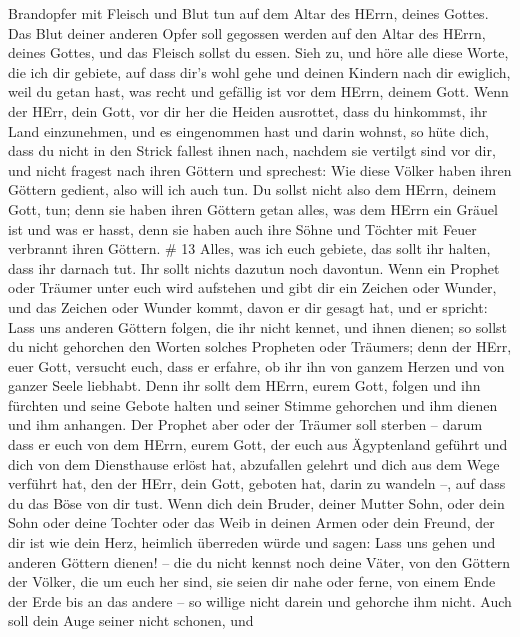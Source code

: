 Brandopfer mit Fleisch und Blut tun auf dem Altar des HErrn, deines
Gottes. Das Blut deiner anderen Opfer soll gegossen werden auf den Altar
des HErrn, deines Gottes, und das Fleisch sollst du essen. 
Sieh zu, und höre alle diese Worte, die ich dir gebiete, auf dass dir's
wohl gehe und deinen Kindern nach dir ewiglich, weil du getan hast, was
recht und gefällig ist vor dem HErrn, deinem Gott.  Wenn
der HErr, dein Gott, vor dir her die Heiden ausrottet, dass du
hinkommst, ihr Land einzunehmen, und es eingenommen hast und darin
wohnst,  so hüte dich, dass du nicht in den Strick fallest
ihnen nach, nachdem sie vertilgt sind vor dir, und nicht fragest nach
ihren Göttern und sprechest: Wie diese Völker haben ihren Göttern
gedient, also will ich auch tun.  Du sollst nicht also dem
HErrn, deinem Gott, tun; denn sie haben ihren Göttern getan alles, was
dem HErrn ein Gräuel ist und was er hasst, denn sie haben auch ihre
Söhne und Töchter mit Feuer verbrannt ihren Göttern. \# 13 
Alles, was ich euch gebiete, das sollt ihr halten, dass ihr darnach tut.
Ihr sollt nichts dazutun noch davontun.  Wenn ein Prophet
oder Träumer unter euch wird aufstehen und gibt dir ein Zeichen oder
Wunder,  und das Zeichen oder Wunder kommt, davon er dir
gesagt hat, und er spricht: Lass uns anderen Göttern folgen, die ihr
nicht kennet, und ihnen dienen;  so sollst du nicht
gehorchen den Worten solches Propheten oder Träumers; denn der HErr,
euer Gott, versucht euch, dass er erfahre, ob ihr ihn von ganzem Herzen
und von ganzer Seele liebhabt.  Denn ihr sollt dem HErrn,
eurem Gott, folgen und ihn fürchten und seine Gebote halten und seiner
Stimme gehorchen und ihm dienen und ihm anhangen.  Der
Prophet aber oder der Träumer soll sterben -- darum dass er euch von dem
HErrn, eurem Gott, der euch aus Ägyptenland geführt und dich von dem
Diensthause erlöst hat, abzufallen gelehrt und dich aus dem Wege
verführt hat, den der HErr, dein Gott, geboten hat, darin zu wandeln --,
auf dass du das Böse von dir tust.  Wenn dich dein Bruder,
deiner Mutter Sohn, oder dein Sohn oder deine Tochter oder das Weib in
deinen Armen oder dein Freund, der dir ist wie dein Herz, heimlich
überreden würde und sagen: Lass uns gehen und anderen Göttern dienen! --
die du nicht kennst noch deine Väter,  von den Göttern der
Völker, die um euch her sind, sie seien dir nahe oder ferne, von einem
Ende der Erde bis an das andere --  so willige nicht darein
und gehorche ihm nicht. Auch soll dein Auge seiner nicht schonen, und
